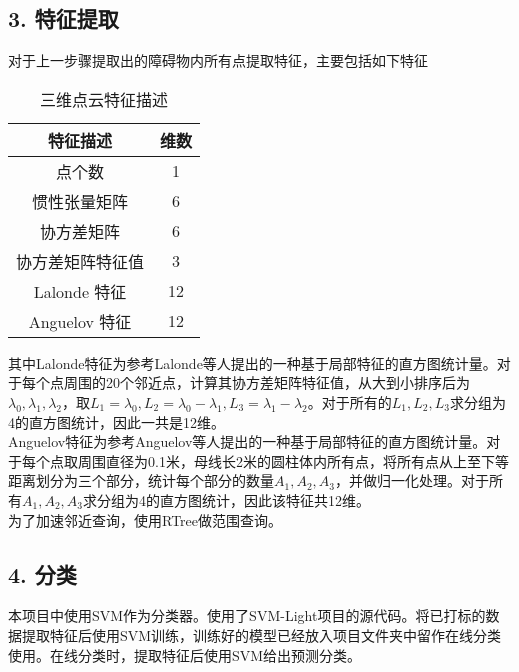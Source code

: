 \documentclass[12pt]{article}
\begin{document}
  	\subsection*{3. 特征提取}
  		对于上一步骤提取出的障碍物内所有点提取特征\cite{1}，主要包括如下特征
  		 \begin{table}[h!]
  			\begin{center}
  				\caption{三维点云特征描述}
  				\begin{tabular}{c|c}
  					\toprule
  					\textbf{特征描述} & \textbf{维数}\\
  					\midrule
  					点个数 & 1\\
  					惯性张量矩阵 & 6\\
  					协方差矩阵 & 6\\
  					协方差矩阵特征值 & 3\\
  					Lalonde 特征 & 12\\
  					Anguelov 特征 & 12\\
  					\bottomrule
  				\end{tabular}
  			\end{center}
  		\end{table}
  		其中Lalonde特征为参考Lalonde等人\cite{2}提出的一种基于局部特征的直方图统计量。对于每个点周围的20个邻近点，计算其协方差矩阵特征值，从大到小排序后为$\lambda_0, \lambda_1, \lambda_2$，取$L_1=\lambda_0,L_2=\lambda_0-\lambda_1,L_3=\lambda_1-\lambda_2$。对于所有的$L_1,L_2,L_3$求分组为4的直方图统计，因此一共是12维。\\
  		Anguelov特征为参考Anguelov等人\cite{3}提出的一种基于局部特征的直方图统计量。对于每个点取周围直径为0.1米，母线长2米的圆柱体内所有点，将所有点从上至下等距离划分为三个部分，统计每个部分的数量$A_1,A_2,A_3$，并做归一化处理。对于所有$A_1,A_2,A_3$求分组为4的直方图统计，因此该特征共12维。\\
  		为了加速邻近查询，使用RTree\cite{5}做范围查询。
  	\subsection*{4. 分类}
  		本项目中使用SVM作为分类器。使用了SVM-Light项目\cite{4}的源代码。将已打标的数据提取特征后使用SVM训练，训练好的模型已经放入项目文件夹中留作在线分类使用。在线分类时，提取特征后使用SVM给出预测分类。
\end{document}
